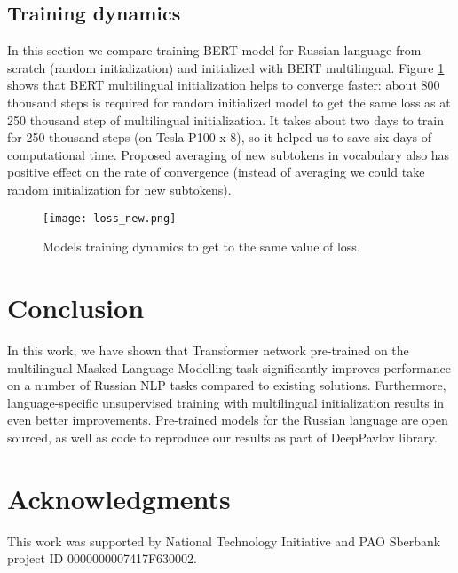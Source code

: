 \documentclass{article}
\begin{document}
\subsection{Training dynamics}
In this section we compare training BERT model for Russian language from scratch (random initialization) and initialized with BERT multilingual. Figure \ref{fig:loss} shows that BERT multilingual initialization helps to converge faster: about 800 thousand steps is required for random initialized model to get the same loss as at 250 thousand step of multilingual initialization. It takes about two days to train for 250 thousand steps (on Tesla P100 x 8), so it helped us to save six days of computational time. Proposed averaging of new subtokens in vocabulary also has positive effect on the rate of convergence (instead of averaging we could take random initialization for new subtokens).

\begin{figure}[ht!]
\centering
\texttt{[image: loss\_new.png]}
\caption{Models training dynamics to get to the same value of loss.}
\label{fig:loss}
\end{figure}

\section{Conclusion}

In this work, we have shown that Transformer network pre-trained on the multilingual Masked Language Modelling task significantly improves performance on a number of Russian NLP tasks compared to existing solutions. Furthermore, language-specific unsupervised training with multilingual initialization results in even better improvements. Pre-trained models for the Russian language are open sourced, as well as code to reproduce our results as part of DeepPavlov library.

\section{Acknowledgments}
This work was supported by National Technology Initiative and PAO Sberbank project ID 0000000007417F630002.
\end{document}
